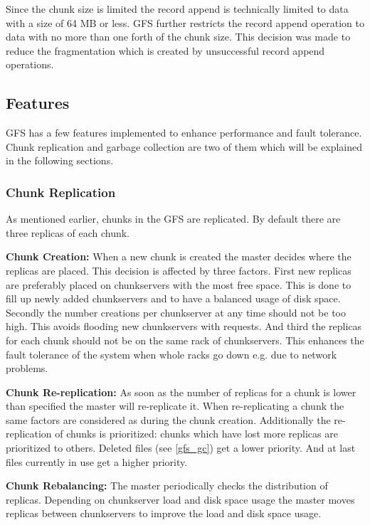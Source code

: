 \documentclass{sig-alternate}
\begin{document}
Since the chunk size is limited the record append is technically limited to data with a size of 64 MB or less. GFS further restricts the record append operation to data with no more than one forth of the chunk size. This decision was made to reduce the fragmentation which is created by unsuccessful record append operations.

\subsection{Features}
GFS has a few features implemented to enhance performance and fault tolerance. Chunk replication and garbage collection are two of them which will be explained in the following sections.

\subsubsection{Chunk Replication}
\label{gfs_fault_tolerance_load_balancing}
As mentioned earlier, chunks in the GFS are replicated. By default there are three replicas of each chunk.

\textbf{Chunk Creation:}
When a new chunk is created the master decides where the replicas are placed. This decision is affected by three factors. First new replicas are preferably placed on chunkservers with the most free space. This is done to fill up newly added chunkservers and to have a balanced usage of disk space. Secondly the number creations per chunkserver at any time should not be too high. This avoids flooding new chunkservers with requests. And third the replicas for each chunk should not be on the same rack of chunkservers. This enhances the fault tolerance of the system when whole racks go down e.g. due to network problems.

\textbf{Chunk Re-replication:}
As soon as the number of replicas for a chunk is lower than specified the master will re-replicate it. When re-replicating a chunk the same factors are considered as during the chunk creation. Additionally the re-replication of chunks is prioritized: chunks which have lost more replicas are prioritized to others. Deleted files (see \ref{gfs_gc}) get a lower priority. And at last files currently in use get a higher priority. 

\textbf{Chunk Rebalancing:}
The master periodically checks the distribution of replicas. Depending on chunkserver load and disk space usage the master moves replicas between chunkservers to improve the load and disk space usage.
\end{document}
